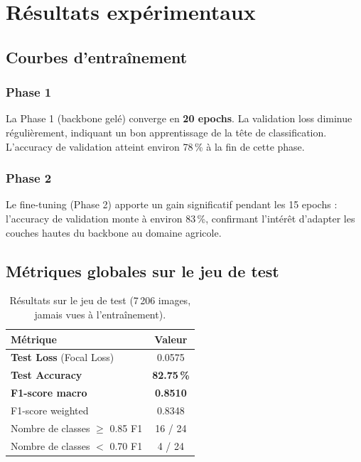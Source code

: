 \documentclass[12pt, a4paper, twoside]{report}
\begin{document}
\chapter{Résultats expérimentaux}
\label{chap:resultats}

\section{Courbes d'entraînement}

\subsection{Phase 1}

La Phase 1 (backbone gelé) converge en \textbf{20 epochs}. La validation loss diminue régulièrement, indiquant un bon apprentissage de la tête de classification. L'accuracy de validation atteint environ 78\,\% à la fin de cette phase.

\subsection{Phase 2}

Le fine-tuning (Phase 2) apporte un gain significatif pendant les 15 epochs : l'accuracy de validation monte à environ 83\,\%, confirmant l'intérêt d'adapter les couches hautes du backbone au domaine agricole.


\section{Métriques globales sur le jeu de test}

\begin{table}[H]
\centering
\caption{Résultats sur le jeu de test (7\,206 images, jamais vues à l'entraînement).}
\label{tab:results-global}
\begin{tabular}{lc}
\toprule
\textbf{Métrique} & \textbf{Valeur} \\
\midrule
\textbf{Test Loss} (Focal Loss)         & 0.0575 \\
\textbf{Test Accuracy}                  & \textbf{82.75\,\%} \\
\textbf{F1-score macro}                 & \textbf{0.8510} \\
F1-score weighted                       & 0.8348 \\
Nombre de classes $\geq$ 0.85 F1        & 16 / 24 \\
Nombre de classes $<$ 0.70 F1           & 4 / 24 \\
\bottomrule
\end{tabular}
\end{table}
\end{document}
